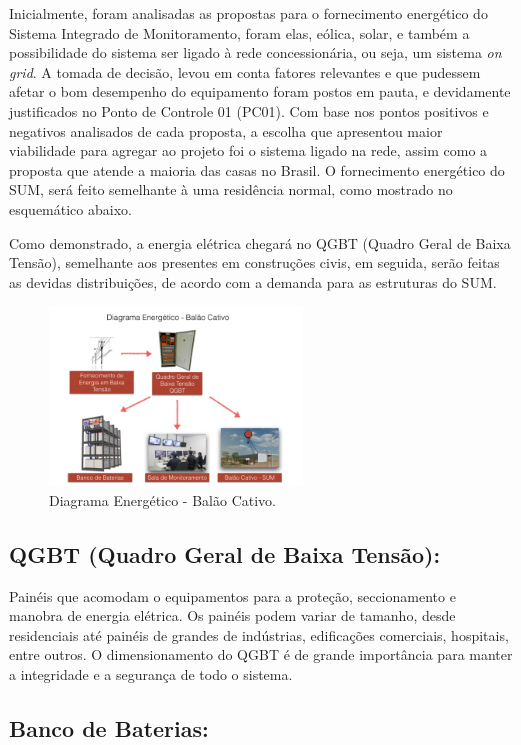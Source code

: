 Inicialmente, foram analisadas as propostas para o fornecimento energético do Sistema Integrado de Monitoramento, foram elas, eólica, solar, e também a possibilidade do sistema ser ligado à rede concessionária, ou seja, um sistema \textit{on grid}.
A tomada de decisão, levou em conta fatores relevantes e que pudessem afetar o bom desempenho do equipamento foram postos em pauta, e devidamente justificados no Ponto de Controle 01 (PC01). Com base nos pontos positivos e negativos analisados de cada proposta, a escolha que apresentou maior viabilidade para agregar ao projeto foi o sistema ligado na rede, assim como a proposta que atende a maioria das casas no Brasil.
O fornecimento energético do SUM, será feito semelhante à uma residência normal, como mostrado no esquemático abaixo.

Como demonstrado, a energia elétrica chegará no QGBT (Quadro Geral de Baixa Tensão), semelhante aos presentes em construções civis, em seguida, serão feitas as devidas distribuições, de acordo com a demanda para as estruturas do SUM.

\begin{figure}[H]
	\centering
	\includegraphics[width=0.6\textwidth]{figuras/Energetico}
	\caption{Diagrama Energético - Balão Cativo.}
	\label{img:Energetico}
\end{figure}

 \subsection{QGBT (Quadro Geral de Baixa Tensão):}
 Painéis que acomodam o equipamentos para a proteção, seccionamento e manobra de energia elétrica. Os painéis podem variar de tamanho, desde residenciais até painéis de grandes de indústrias, edificações comerciais, hospitais, entre outros. O dimensionamento do QGBT é de grande importância para manter a integridade e a segurança de todo o sistema.

\subsection{Banco de Baterias:}

